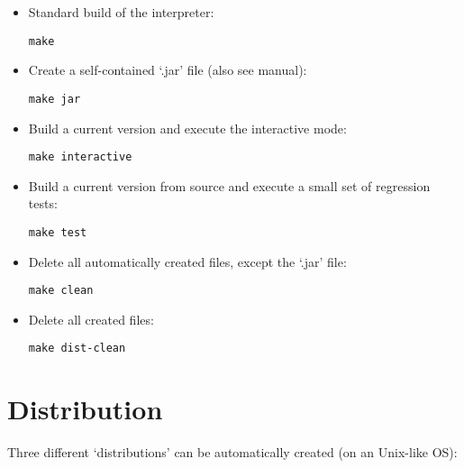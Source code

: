 \begin{itemize}
	\item Standard build of the interpreter:
\begin{lstlisting}[frame=none,numbers=none]
make
\end{lstlisting}

	\item Create a self-contained `.jar' file (also see manual):

\begin{lstlisting}[frame=none,numbers=none]
make jar
\end{lstlisting}

	\item Build a current version and execute the interactive mode:

\begin{lstlisting}[frame=none,numbers=none]
make interactive
\end{lstlisting}

	\item Build a current version from source and execute a small set of regression tests:

\begin{lstlisting}[frame=none,numbers=none]
make test
\end{lstlisting}

	\item Delete all automatically created files, except the `.jar' file:

\begin{lstlisting}[frame=none,numbers=none]
make clean
\end{lstlisting}

	\item Delete all created files:

\begin{lstlisting}[frame=none,numbers=none]
make dist-clean
\end{lstlisting}

\end{itemize}

\section{Distribution}

Three different `distributions' can be automatically created (on an Unix-like OS):

